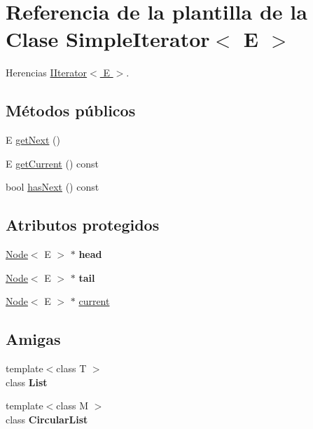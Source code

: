 \hypertarget{classSimpleIterator}{\section{Referencia de la plantilla de la Clase Simple\-Iterator$<$ E $>$}
\label{classSimpleIterator}
}


Herencias \hyperlink{classIIterator}{I\-Iterator$<$ E $>$}.

\subsection*{Métodos públicos}
\begin{DoxyCompactItemize}
\item 
E \hyperlink{classSimpleIterator_ab01032dba9ff4f1a1c47af3082b717d5}{get\-Next} ()
\item 
E \hyperlink{classSimpleIterator_ac9460c98985a20f781f351c85b8a3ba2}{get\-Current} () const 
\item 
bool \hyperlink{classSimpleIterator_ab946b3d707e32d4d53f15af201ea2113}{has\-Next} () const 
\end{DoxyCompactItemize}
\subsection*{Atributos protegidos}
\begin{DoxyCompactItemize}
\item 
\hypertarget{classSimpleIterator_a0403100ab86dba958115cea4147508a7}{\hyperlink{classNode}{Node}$<$ E $>$ $\ast$ {\bfseries head}}\label{classSimpleIterator_a0403100ab86dba958115cea4147508a7}

\item 
\hypertarget{classSimpleIterator_a9bfb7d6c12bc1e8031b5c0869026415a}{\hyperlink{classNode}{Node}$<$ E $>$ $\ast$ {\bfseries tail}}\label{classSimpleIterator_a9bfb7d6c12bc1e8031b5c0869026415a}

\item 
\hyperlink{classNode}{Node}$<$ E $>$ $\ast$ \hyperlink{classSimpleIterator_a7777fefe265a5067ec9319d8c1a3e278}{current}
\end{DoxyCompactItemize}
\subsection*{Amigas}
\begin{DoxyCompactItemize}
\item 
\hypertarget{classSimpleIterator_a8740adf5dfdafdc64940ab42ed663bd2}{{\footnotesize template$<$class T $>$ }\\class {\bfseries List}}\label{classSimpleIterator_a8740adf5dfdafdc64940ab42ed663bd2}

\item 
\hypertarget{classSimpleIterator_ade98163865dd2cf1343ae0a4dbba6b29}{{\footnotesize template$<$class M $>$ }\\class {\bfseries Circular\-List}}\label{classSimpleIterator_ade98163865dd2cf1343ae0a4dbba6b29}

\end{DoxyCompactItemize}


